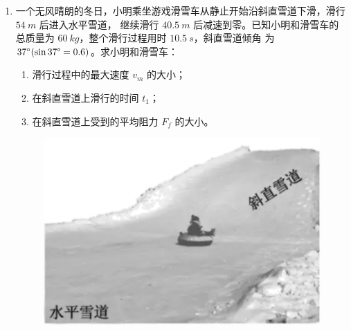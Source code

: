 \begin{enumerate}


\newpage

\gaokaojs

\item 
一个无风晴朗的冬日，小明乘坐游戏滑雪车从静止开始沿斜直雪道下滑，滑行 $ 54 \ m $ 后进入水平雪道，
继续滑行 $ 40.5 \ m $ 后减速到零。已知小明和滑雪车的总质量为 $ 60 \ kg $，整个滑行过程用时 $ 10.5 \ s $，斜直雪道倾角
为 $ 37 ^{ \circ } (\sin 37 \degree =0.6) $。求小明和滑雪车：
\begin{enumerate}
\item
滑行过程中的最大速度 $ v_{m} $ 的大小；
\item 
在斜直雪道上滑行的时间 $ t_{1} $；
\item 
在斜直雪道上受到的平均阻力 $ F_{f} $ 的大小。

\end{enumerate}
\begin{figure}[h!]
\flushright 
\includegraphics[width=0.23\linewidth]{picture/screenshot039}
\end{figure}



\end{enumerate}
